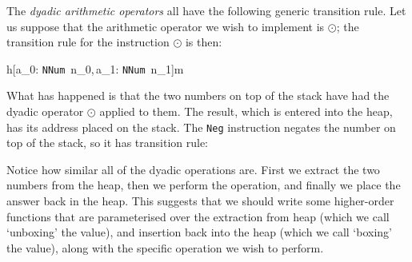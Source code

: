 The {\em dyadic arithmetic operators\/} all have the following generic transition rule.  Let us
suppose that the arithmetic operator we wish to implement is $\odot$;
the transition rule for the instruction $\odot$ is then:

\gmruled%
{%
{h[a_0: \mbox{\tt NNum}\ n_0,\,a_1: \mbox{\tt NNum}\ n_1]}{m}}%
{}

What has happened is that the two numbers on top of the stack have had
the dyadic operator $\odot$ applied to them. The result, which is
entered into the heap, has its address placed on the stack. The \mbox{\tt Neg}
instruction negates the number on top of the stack, so it has
transition rule:

\gmruled%
{}%
{}

Notice how similar all of the dyadic operations are. First we extract
the two numbers from the heap, then we perform the operation, and
finally we place the answer back in the heap. This suggests that we
should write some higher-order functions
that are parameterised over the extraction from heap (which we call
`unboxing' the value), and
insertion back into the heap (which we call `boxing' the value), along with the specific operation we
wish to perform.

